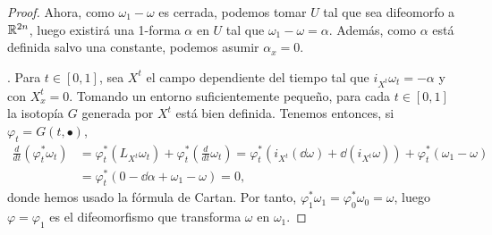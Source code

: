 \begin{proof}
  Ahora, como $\omega_1-\omega$ es cerrada, podemos tomar $U$ tal que sea difeomorfo a $\mathbb{R}^{2n}$, luego existirá una 1-forma $\alpha$ en $U$ tal que $\omega_1-\omega=\alpha$. Además, como $\alpha$ está definida salvo una constante, podemos asumir $\alpha_x=0$.

  . Para $t \in [0,1]$, sea $X^t$ el campo dependiente del tiempo tal que $i_{X^t}\omega_t= - \alpha$ y con $X^t_x=0$. Tomando un entorno suficientemente pequeño, para cada $t \in [0,1]$ la isotopía $G$ generada por $X^t$ está bien definida. Tenemos entonces, si $\varphi_t=G(t,\bullet)$,
  \begin{align*}
    \frac{d}{dt}(\varphi_t^*\omega_t) & = \varphi_t^* (L_{X^t}\omega_t) + \varphi_t^* \left( \frac{d}{dt}\omega_t \right) = \varphi_t^* (i_{X^t}(\dd \omega)+\dd (i_{X^t}\omega))+\varphi_t^*(\omega_1-\omega) \\
    & = \varphi_t^*(0-\dd \alpha + \omega_1 - \omega) = 0,
  \end{align*}
  donde hemos usado la fórmula de Cartan. Por tanto, $\varphi_1^*\omega_1=\varphi_0^*\omega_0=\omega$, luego $\varphi=\varphi_1$ es el difeomorfismo que transforma $\omega$ en $\omega_1$.
  
\end{proof}

